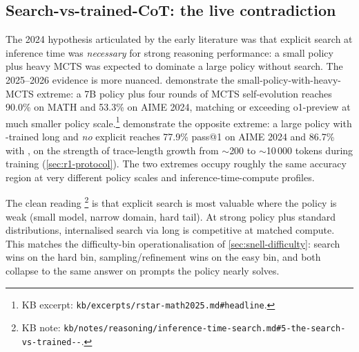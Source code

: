 \subsection{Search-vs-trained-CoT: the live contradiction}
\label{sec:tree-search-vs-cot}

The 2024 hypothesis articulated by the early  literature
was that explicit search at inference time was \emph{necessary} for
strong reasoning performance: a small policy plus heavy MCTS was
expected to dominate a large policy without search. The 2025--2026
evidence is more nuanced. \citet[\S 4]{rstar-math2025} demonstrate
the small-policy-with-heavy-MCTS extreme: a 7B policy plus four rounds
of MCTS self-evolution reaches 90.0\% on MATH and 53.3\% on AIME 2024,
matching or exceeding o1-preview at much smaller policy
scale.\footnote{KB excerpt:
\texttt{kb/excerpts/rstar-math2025.md\#headline}.} \citet{deepseek-r1}
demonstrate the opposite extreme: a large policy with -trained
long  and \emph{no} explicit  reaches
77.9\% pass@1 on AIME 2024 and 86.7\% with , on the
strength of trace-length growth from $\sim$200 to $\sim$10\,000 tokens
during training (\cref{sec:r1-protocol}). The two extremes occupy
roughly the same accuracy region at very different policy scales and
inference-time-compute profiles.

The clean reading%
\footnote{KB note:
\texttt{kb/notes/reasoning/inference-time-search.md\#5-the-search-vs-trained--}.}
is that explicit search is most valuable where the policy is weak
(small model, narrow domain, hard tail). At strong policy plus
standard distributions, internalised search via long  is
competitive at matched compute. This matches the difficulty-bin
operationalisation of \cref{sec:snell-difficulty}: search wins on
the hard bin, sampling/refinement wins on the easy bin, and both
collapse to the same answer on prompts the policy nearly solves.

